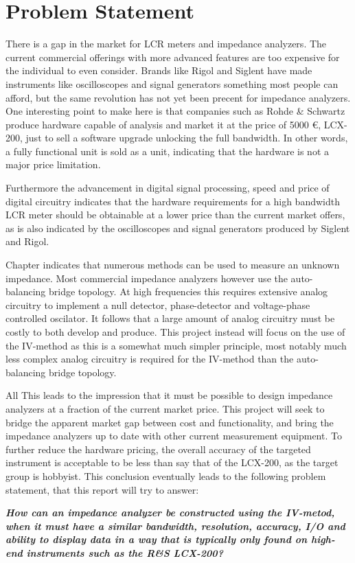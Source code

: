 \chapter{Problem Statement} \label{ch:ProblemStatement}
There is a gap in the market for LCR meters and impedance analyzers. The current commercial offerings with more advanced features are too expensive for the individual to even consider. Brands like Rigol and Siglent have made instruments like oscilloscopes and signal generators something most people can afford, but the same revolution has not yet been precent for impedance analyzers. One interesting point to make here is that companies such as Rohde \& Schwartz produce hardware capable of  analysis and market it at the price of 5000 €, LCX-200, just to sell a software upgrade unlocking the full  bandwidth. In other words, a fully functional  unit is sold as a  unit, indicating that the hardware is not a major price limitation. 

Furthermore the advancement in digital signal processing, speed and price of digital circuitry indicates that the hardware requirements for a high bandwidth LCR meter should be obtainable at a lower price than the current market offers, as is also indicated by the oscilloscopes and signal generators produced by Siglent and Rigol.

Chapter  indicates that numerous methods can be used to measure an unknown impedance. Most commercial impedance analyzers however use the auto-balancing bridge topology. At high frequencies this requires extensive analog circuitry to implement a null detector, phase-detector and voltage-phase controlled oscilator. It follows that a large amount of analog circuitry must be costly to both develop and produce. This project instead will focus on the use of the IV-method as this is a somewhat much simpler principle, most notably much less complex analog circuitry is required for the IV-method than the auto-balancing bridge topology.

All This leads to the impression that it must be possible to design impedance analyzers at a fraction of the current market price. This project will seek to bridge the apparent market gap between cost and functionality, and bring the impedance analyzers up to date with other current measurement equipment. To further reduce the hardware pricing, the overall accuracy of the targeted instrument is acceptable to be less than say that of the LCX-200, as the target group is hobbyist. This conclusion eventually leads to the following problem statement,
that this report will try to answer:

\textbf{\textit{How can an impedance analyzer be constructed using the IV-metod, when it must have a similar bandwidth, resolution, accuracy, I/O and ability to display data in a way that is typically only found on high-end instruments such as the R\&S LCX-200?}}